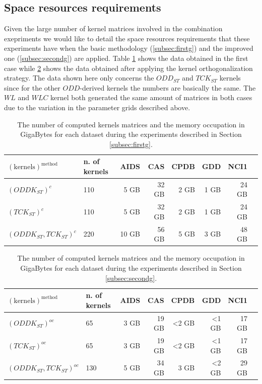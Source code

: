 \subsection{Space resources requirements}
Given the large number of kernel matrices involved in the combination exepriments
we would like to detail the space resources requirements that these experiments
have when the basic methodology (\ref{subsec:firstg}) and the improved one (\ref{subsec:secondg})
are applied.
Table \ref{table:mem1} shows the data obtained in the first case while \ref{table:mem2} shows
the data obtained after applying the kernel orthogonalization strategy.
The data shown here only concerns the $ODD_{ST}$ and $TCK_{ST}$ kernels since for the 
other $ODD$-derived kernels the numbers are basically the same.
The $WL$ and $WLC$ kernel both generated the same amount of matrices in both cases
due to the variation in the parameter grids described above.

\begin{table}[ht]
    \centering\footnotesize
    \begin{tabular}{|l|l|r|r|r|r|r|r|}
        \hline
        $\mathrm{(kernels)^{method}}$ & n. of kernels & AIDS & CAS & CPDB & GDD & NCI1 \\
        \hline
        $(ODDK_{ST})^c$ & 110 & 5 GB & 32 GB & 2 GB & 1 GB & 24 GB \\
        \hline
        $(TCK_{ST})^c$ & 110 & 5 GB & 32 GB & 2 GB & 1 GB & 24 GB \\
        \hline
        $(ODDK_{ST}, TCK_{ST})^c$ & 220 & 10 GB & 56 GB & 5 GB & 3 GB & 48 GB \\
        \hline
    \end{tabular}
    \caption{\footnotesize The number of computed kernels matrices and the memory
    occupation in GigaBytes for each dataset during the experiments described in
    Section \ref{subsec:firstg}.}
    \label{table:mem1}
\end{table}
\begin{table}[ht]
    \centering\footnotesize
    \begin{tabular}{|l|l|r|r|r|r|r|r|}
        \hline
        $\mathrm{(kernels)^{method}}$  & n. of kernels & AIDS & CAS & CPDB & GDD & NCI1 \\
        \hline
        $(ODDK_{ST})^{oc}$ & 65 & 3 GB & 19 GB & <2 GB & <1 GB & 17 GB \\
        \hline
        $(TCK_{ST})^{oc}$ & 65 & 3 GB & 19 GB & <2 GB & <1 GB & 17 GB \\
        \hline
        $(ODDK_{ST}, TCK_{ST})^{oc}$ & 130 & 5 GB & 34 GB & 3 GB & <2 GB & 29 GB \\
        \hline
    \end{tabular}
    \caption{\footnotesize The number of computed kernels matrices and the memory
    occupation in GigaBytes for each dataset during the experiments described in 
    Section \ref{subsec:secondg}.}
    \label{table:mem2}
\end{table}


